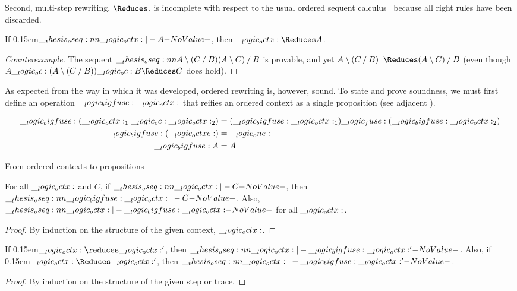 Second, multi-step rewriting, $\Reduces$, is incomplete with respect to the usual ordered sequent calculus~ because all right rules have been discarded.%
%
 \begin{falseclaim}[Completeness]
  If \kern0.15em$\oseq{\octx |- A}$, then\/ $\octx \Reduces A$.
\end{falseclaim}
%
\begin{proof}[Counterexample]
  The sequent $\oseq{A \limp (C \pmir B) |- (A \limp C) \pmir B}$ is provable, and yet $A \limp (C \pmir B) \Longarrownot\Reduces (A \limp C) \pmir B$ (even though $A \oc (A \limp (C \pmir B)) \oc B \Reduces C$ does hold).
\end{proof}
\noindent
As expected from the way in which it was developed, ordered rewriting is, however, sound.
To state and prove soundness, we must first define an operation $\__logic_bigfuse: \__logic_octx:$ that reifies an ordered context as a single proposition (see adjacent ).%
%
\begin{marginfigure}
  \begin{align*}
    \__logic_bigfuse: (\__logic_octx:_1 \__logic_oc: \__logic_octx:_2) &= (\__logic_bigfuse: \__logic_octx:_1) \__logic_fuse: (\__logic_bigfuse: \__logic_octx:_2) \\
    \__logic_bigfuse: (\__logic_octxe:) &= \__logic_one: \\
    \__logic_bigfuse: A &= A
  \end{align*}
  \caption{From ordered contexts to propositions}\label{fig:ordered-rewriting:bigfuse}
\end{marginfigure}%
%
\begin{lemma}
  For all $\__logic_octx:$ and $C$, if $\oseq{\octx |- C}$, then $\oseq{\bigfuse \octx |- C}$.
  Also, $\oseq{\octx |- \bigfuse \octx}$ for all $\__logic_octx:$.
\end{lemma}
\begin{proof}
  By induction on the structure of the given context, $\__logic_octx:$.
\end{proof}
%
\begin{theorem}[Soundness]
  If \kern0.15em$\octx \reduces \octx'$, then\/ $\oseq{\octx |- \bigfuse \octx'}$.
  Also, if \kern0.15em$\octx \Reduces \octx'$, then\/ $\oseq{\octx |- \bigfuse \octx'}$.
\end{theorem}
%
\begin{proof}
  By induction on the structure of the given step or trace.
\end{proof}



